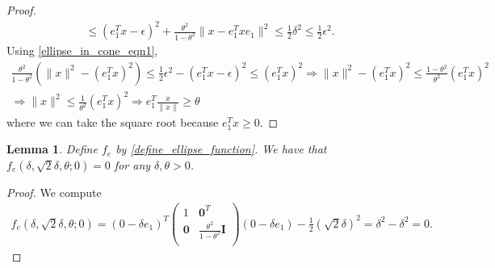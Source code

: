 \documentclass{article}
\newtheorem{lemma}[theorem]{Lemma}
\theoremstyle{case}
\numberwithin{theorem}{subsection}
\begin{document}
\begin{proof}
\begin{align*}
\le (e_1^Tx - \epsilon)^2 + \frac{\theta^2}{1 - \theta^2}\|x - e_1^Tx e_1\|^2 \le \frac 1 2 \delta^2 \le \frac 1 2 \epsilon^2.
\end{align*}
Using \cref{ellipse_in_cone_eqn1}, 
\begin{align*}
\frac{\theta^2}{1 - \theta^2}(\|x\|^2 - (e_1^Tx)^2) \le \frac 1 2 \epsilon^2 - (e_1^Tx - \epsilon)^2 \le (e_1^Tx)^2
\Longrightarrow \|x\|^2 - (e_1^Tx)^2 \le \frac{1 - \theta^2}{\theta^2}(e_1^Tx)^2 \\
\Longrightarrow \|x\|^2 \le \frac 1 {\theta^2}(e_1^Tx)^2
\Longrightarrow e_1^T\frac{x}{\|x\|} \ge \theta
\end{align*}
where we can take the square root because $e_1^Tx \ge 0$.
\end{proof}

\begin{lemma}
\label{ellipse_fits}
Define $f_e$ by \cref{define_ellipse_function}.
We have that $f_e(\delta, \sqrt{2}\delta, \theta; 0) = 0$ for any $\delta, \theta > 0$.
\end{lemma}
\begin{proof}
We compute
\begin{align*}
f_e(\delta, \sqrt{2}\delta, \theta; 0) =(0 - \delta e_1)^T\begin{pmatrix}
1 & \boldsymbol0^T \\
\boldsymbol 0 & \frac{\theta^2}{1 - \theta^2} \boldsymbol I \\
\end{pmatrix}(0 - \delta e_1) - \frac 1 2 (\sqrt 2 \delta)^2
=\delta^2 - \delta^2 = 0.
\end{align*}
\end{proof}
\end{document}
